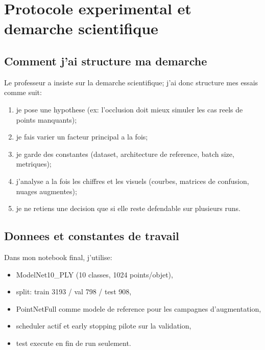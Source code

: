 \chapter{Protocole experimental et demarche scientifique}

\section{Comment j'ai structure ma demarche}
Le professeur a insiste sur la demarche scientifique; j'ai donc structure mes essais comme suit:
\begin{enumerate}
  \item je pose une hypothese (ex: l'occlusion doit mieux simuler les cas reels de points manquants);
  \item je fais varier un facteur principal a la fois;
  \item je garde des constantes (dataset, architecture de reference, batch size, metriques);
  \item j'analyse a la fois les chiffres et les visuels (courbes, matrices de confusion, nuages augmentes);
  \item je ne retiens une decision que si elle reste defendable sur plusieurs runs.
\end{enumerate}

\section{Donnees et constantes de travail}
Dans mon notebook final, j'utilise:
\begin{itemize}
  \item ModelNet10\_PLY (10 classes, 1024 points/objet),
  \item split: train 3193 / val 798 / test 908,
  \item PointNetFull comme modele de reference pour les campagnes d'augmentation,
  \item scheduler actif et early stopping pilote sur la validation,
  \item test execute en fin de run seulement.
\end{itemize}

